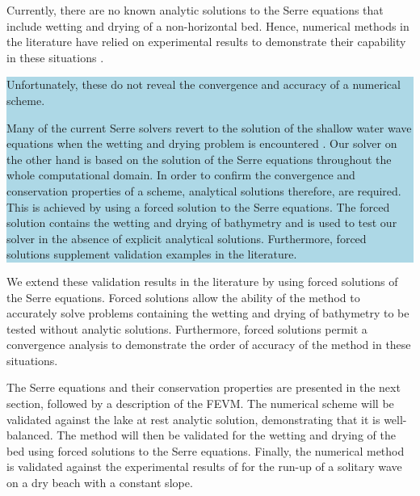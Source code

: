 \documentclass[times]{elsarticle}
\newcommand{\hlb}[1] {\par\colorbox{lightblue}{\parbox{\linewidth}{#1}}}
\newcommand{\hlr}[1] {\par\colorbox{lightred}{\parbox{\linewidth}{#1}}}
\newcommand{\hlb}[1] {{#1}}
\newcommand{\hlr}[1] {{}}
\begin{document}
Currently, there are no known analytic solutions to the Serre equations that include wetting and drying of a non-horizontal bed. Hence, numerical methods in the literature have relied on experimental results to demonstrate their capability in these situations \cite{Tissier-2011,Li-2014-169,Filippini-etal-2016-381,DoCarmo-2019-125}. \hlb{ Unfortunately, these do not reveal the convergence and accuracy of a numerical scheme.

Many of the current Serre solvers revert to the solution of the shallow water wave equations when the wetting and drying problem is encountered \cite{Roeber-2010}.  Our solver on the other hand is based on the solution of the Serre equations throughout the whole computational domain. In order to confirm the convergence and conservation properties of a scheme, analytical solutions therefore, are required. This is achieved by using a forced solution to the Serre equations. The forced solution contains the wetting and drying of bathymetry and is used to test our solver in the absence of explicit analytical solutions. Furthermore, forced solutions supplement validation examples in the literature.}

\hlr{We extend these validation results in the literature by using forced solutions of the Serre equations. Forced solutions allow the ability of the method to accurately solve problems containing the wetting and drying of bathymetry to be tested without analytic solutions. Furthermore, forced solutions permit a convergence analysis to demonstrate the order of accuracy of the method in these situations.}

The Serre equations and their conservation properties are presented in the next section, followed by a description of the FEVM. The numerical scheme will be validated against the lake at rest analytic solution, demonstrating that it is well-balanced. The method will then be validated for the wetting and drying of the bed using forced solutions to the Serre equations. Finally, the numerical method is validated against the experimental results of \citet{Synolakis-1987-523} for the run-up of a solitary wave on a dry beach with a constant slope.

\end{document}
